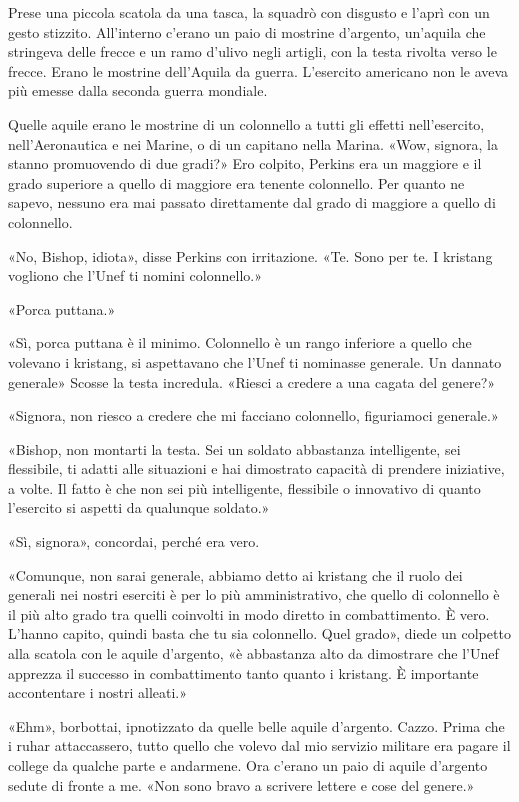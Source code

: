 Prese una piccola scatola da una tasca, la squadrò con disgusto e l'aprì
con un gesto stizzito. All'interno c'erano un paio di mostrine
d'argento, un'aquila che stringeva delle frecce e un ramo d'ulivo negli
artigli, con la testa rivolta verso le frecce. Erano le mostrine
dell'Aquila da guerra. L'esercito americano non le aveva più emesse
dalla seconda guerra mondiale.

Quelle aquile erano le mostrine di un colonnello a tutti gli effetti
nell'esercito, nell'Aeronautica e nei Marine, o di un capitano nella
Marina. «Wow, signora, la stanno promuovendo di due gradi?» Ero colpito,
Perkins era un maggiore e il grado superiore a quello di maggiore era
tenente colonnello. Per quanto ne sapevo, nessuno era mai passato
direttamente dal grado di maggiore a quello di colonnello.

«No, Bishop, idiota», disse Perkins con irritazione. «Te. Sono per te. I
kristang vogliono che l'Unef ti nomini colonnello.»

«Porca puttana.»

«Sì, porca puttana è il minimo. Colonnello è un rango inferiore a quello
che volevano i kristang, si aspettavano che l'Unef ti nominasse
generale. Un dannato generale» Scosse la testa incredula. «Riesci a
credere a una cagata del genere?»

«Signora, non riesco a credere che mi facciano colonnello, figuriamoci
generale.»

«Bishop, non montarti la testa. Sei un soldato abbastanza intelligente,
sei flessibile, ti adatti alle situazioni e hai dimostrato capacità di
prendere iniziative, a volte. Il fatto è che non sei più intelligente,
flessibile o innovativo di quanto l'esercito si aspetti da qualunque
soldato.»

«Sì, signora», concordai, perché era vero.

«Comunque, non sarai generale, abbiamo detto ai kristang che il ruolo
dei generali nei nostri eserciti è per lo più amministrativo, che quello
di colonnello è il più alto grado tra quelli coinvolti in modo diretto
in combattimento. È vero. L'hanno capito, quindi basta che tu sia
colonnello. Quel grado», diede un colpetto alla scatola con le aquile
d'argento, «è abbastanza alto da dimostrare che l'Unef apprezza il
successo in combattimento tanto quanto i kristang. È importante
accontentare i nostri alleati.»

«Ehm», borbottai, ipnotizzato da quelle belle aquile d'argento. Cazzo.
Prima che i ruhar attaccassero, tutto quello che volevo dal mio servizio
militare era pagare il college da qualche parte e andarmene. Ora c'erano
un paio di aquile d'argento sedute di fronte a me. «Non sono bravo a
scrivere lettere e cose del genere.»

